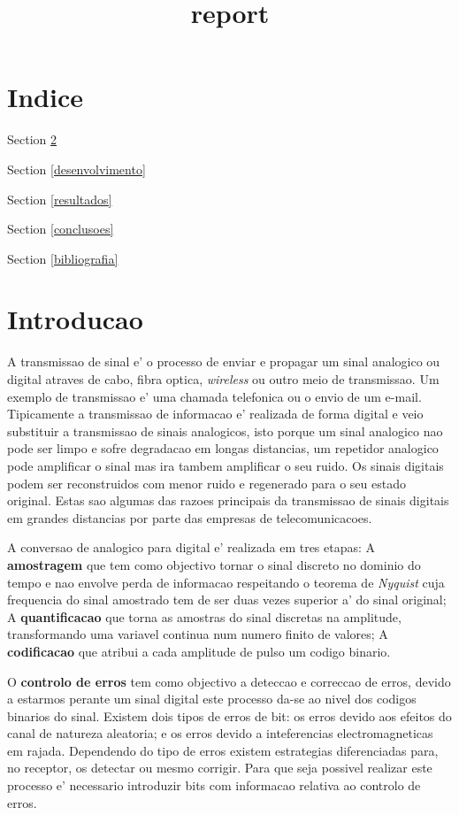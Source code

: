 \documentclass[11pt]{article}
\title{report}
\begin{document}
    
    
    \maketitle
    
    

    
    \section{Indice}\label{indice}

Section \ref{introducao}

Section \ref{desenvolvimento}

Section \ref{resultados}

Section \ref{conclusoes}

Section \ref{bibliografia}

    \section{Introducao}\label{introducao}

A transmissao de sinal e' o processo de enviar e propagar um sinal
analogico ou digital atraves de cabo, fibra optica, \emph{wireless} ou
outro meio de transmissao. Um exemplo de transmissao e' uma chamada
telefonica ou o envio de um e-mail. Tipicamente a transmissao de
informacao e' realizada de forma digital e veio substituir a transmissao
de sinais analogicos, isto porque um sinal analogico nao pode ser limpo
e sofre degradacao em longas distancias, um repetidor analogico pode
amplificar o sinal mas ira tambem amplificar o seu ruido. Os sinais
digitais podem ser reconstruidos com menor ruido e regenerado para o seu
estado original. Estas sao algumas das razoes principais da transmissao
de sinais digitais em grandes distancias por parte das empresas de
telecomunicacoes.

A conversao de analogico para digital e' realizada em tres etapas: A
\textbf{amostragem} que tem como objectivo tornar o sinal discreto no
dominio do tempo e nao envolve perda de informacao respeitando o teorema
de \emph{Nyquist} cuja frequencia do sinal amostrado tem de ser duas
vezes superior a' do sinal original; A \textbf{quantificacao} que torna
as amostras do sinal discretas na amplitude, transformando uma variavel
continua num numero finito de valores; A \textbf{codificacao} que
atribui a cada amplitude de pulso um codigo binario.

O \textbf{controlo de erros} tem como objectivo a deteccao e correccao
de erros, devido a estarmos perante um sinal digital este processo da-se
ao nivel dos codigos binarios do sinal. Existem dois tipos de erros de
bit: os erros devido aos efeitos do canal de natureza aleatoria; e os
erros devido a inteferencias electromagneticas em rajada. Dependendo do
tipo de erros existem estrategias diferenciadas para, no receptor, os
detectar ou mesmo corrigir. Para que seja possivel realizar este
processo e' necessario introduzir bits com informacao relativa ao
controlo de erros.
\end{document}
